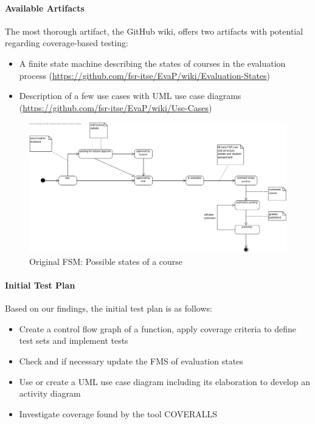 \paragraph{Available Artifacts}
The most thorough artifact, the GitHub wiki, offers two artifacts with potential regarding coverage-based testing:
\begin{itemize}
    \item A finite state machine describing the states of courses in the evaluation process (\url{https://github.com/fsr-itse/EvaP/wiki/Evaluation-States})
    \item Description of a few use cases with UML use case diagrams (\url{https://github.com/fsr-itse/EvaP/wiki/Use-Cases})
\end{itemize}
\begin{figure}[h]
    \centering
    \includegraphics[width=\textwidth, keepaspectratio]{graphics/original_states_of_a_course}
    \caption{Original FSM: Possible states of a course}
    \label{fig:original-states}
\end{figure}

\paragraph{Initial Test Plan}
Based on our findings, the initial test plan is as follows:
\begin{itemize}
    \item Create a control flow graph of a function, apply coverage criteria to define test sets and implement tests
    \item Check and if necessary update the FMS of evaluation states
    \item Use or create a UML use case diagram including its elaboration to develop an activity diagram
    \item Investigate coverage found by the tool COVERALLS
\end{itemize}
